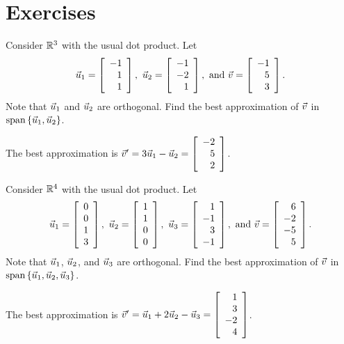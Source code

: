 \documentclass{ximera}
\author{Zack Reed}
\begin{document}
\section*{Exercises}

\begin{exercise}
  Consider $\R^3$ with the usual dot product. Let
  \begin{equation*}
    \vect{u}_1 = \startmat{r} -1 \\ 1 \\ 1 \stopmat,
    \quad
    \vect{u}_2 = \startmat{r} -1 \\ -2 \\ 1 \stopmat,
    \quad\mbox{and}\quad
    \vect{v} = \startmat{r} -1 \\ 5 \\ 3 \stopmat.
  \end{equation*}
  Note that $\vect{u}_1$ and $\vect{u}_2$ are orthogonal.
  Find the best approximation of $\vect{v}$ in $\sspan\set{\vect{u}_1,
    \vect{u}_2}$.
  \begin{solution}
    The best approximation is $\vect{v}' = 3\vect{u}_1 - \vect{u}_2 =
    \startmat{r} -2 \\ 5 \\ 2 \stopmat$.
  \end{solution}
\end{exercise}

\begin{exercise}
  Consider $\R^4$ with the usual dot product. Let
  \begin{equation*}
    \vect{u}_1 = \startmat{r} 0 \\ 0 \\ 1 \\ 3 \stopmat,
    \quad
    \vect{u}_2 = \startmat{r} 1 \\ 1 \\ 0 \\ 0 \stopmat,
    \quad
    \vect{u}_3 = \startmat{r} 1 \\ -1 \\ 3 \\ -1 \stopmat,
    \quad\mbox{and}\quad
    \vect{v} = \startmat{r} 6 \\  -2 \\ -5 \\  5 \stopmat.
  \end{equation*}
  Note that $\vect{u}_1$, $\vect{u}_2$, and $\vect{u}_3$ are
  orthogonal.  Find the best approximation of $\vect{v}$ in
  $\sspan\set{\vect{u}_1,\vect{u}_2, \vect{u}_3}$.
  \begin{solution}
    The best approximation is
    $\vect{v}' = \vect{u}_1 + 2\vect{u}_2 - \vect{u}_3
    = \startmat{r} 1 \\ 3 \\ -2 \\ 4 \stopmat$.
  \end{solution}
\end{exercise}
\end{document}

